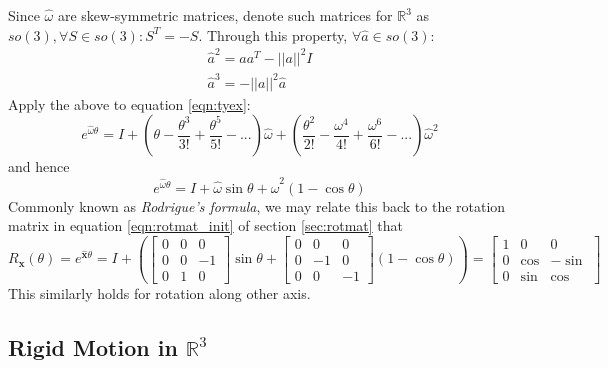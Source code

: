 \documentclass[letterpaper]{article}
\begin{document}
Since $\widehat{\omega}$ are skew-symmetric matrices, denote such matrices for $\mathbb{R}^3$ as $so(3), \forall S \in so(3): S^{T} = -S$. 
Through this property, $\forall \widehat{a} \in so(3)$:
\begin{equation*}
  \begin{split}
    \widehat{a}^2 = aa^T - ||a||^2I\\
    \widehat{a}^3 = -||a||^2\widehat{a}
  \end{split}
\end{equation*}
Apply the above to equation \ref{eqn:tyex}:
\begin{equation*}
  e^{\widehat{\omega}\theta} = I + \left(\theta - \frac{\theta^3}{3!} + \frac{\theta^5}{5!} - ...\right)\widehat{\omega} +
    \left(\frac{\theta^2}{2!} - \frac{\omega^4}{4!} + \frac{\omega^6}{6!} - ... \right)\widehat{\omega}^2
\end{equation*}
and hence
\begin{equation}
  \boxed{e^{\widehat{\omega}\theta} = I + \widehat{\omega}\sin\theta + \widehat{\omega}^2\left(1 - \cos\theta\right)}
\end{equation}
Commonly known as \emph{Rodrigue's formula}, we may relate this back to the rotation matrix in equation \ref{eqn:rotmat_init} of section \ref{sec:rotmat} that
\begin{equation}
  R_{\mathbf{x}}(\theta) = e^{\widehat{\mathbf{x}}\theta} = I + \left(
    \begin{bmatrix}
    0&0&0\\0&0&-1\\0&1&0
  \end{bmatrix} \sin\theta +
  \begin{bmatrix}
    0&0&0\\0&-1&0\\0&0&-1
  \end{bmatrix} (1-\cos\theta)
  \right) = \begin{bmatrix}
    1 & 0 & 0\\
    0 &\cos & -\sin\\
    0 &\sin & \cos
  \end{bmatrix}
\end{equation}
This similarly holds for rotation along other axis.

\subsection{Rigid Motion in $\mathbb{R}^3$}
\end{document}
